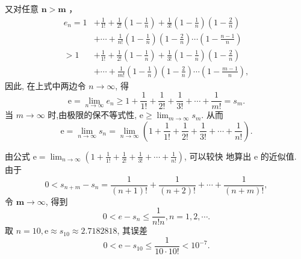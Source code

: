 \documentclass[t,12pt,mathserif] {beamer}
\begin{document}
\begin{frame}{}%
    又对任意 $\boldsymbol{n}>\boldsymbol{m}$ ，
$$
\begin{aligned}
e_n=1 & +\frac{1}{1 !}+\frac{1}{2 !}\left(1-\frac{1}{n}\right)+\frac{1}{3 !}\left(1-\frac{1}{n}\right)\left(1-\frac{2}{n}\right) \\
& +\cdots+\frac{1}{n !}\left(1-\frac{1}{n}\right)\left(1-\frac{2}{n}\right) \cdots\left(1-\frac{n-1}{n}\right) \\
>1 & +\frac{1}{1 !}+\frac{1}{2 !}\left(1-\frac{1}{n}\right)+\frac{1}{3 !}\left(1-\frac{1}{n}\right)\left(1-\frac{2}{n}\right) \\
& +\cdots+\frac{1}{m !}\left(1-\frac{1}{n}\right)\left(1-\frac{2}{n}\right) \cdots\left(1-\frac{m-1}{n}\right),
\end{aligned}
$$
因此, 在上式中两边令 $n \rightarrow \infty$, 得
$$
\mathrm{e}=\lim _{n \rightarrow \infty} e_n \geq 1+\frac{1}{1 !}+\frac{1}{2 !}+\frac{1}{3 !}+\cdots+\frac{1}{m !}=s_m .
$$
当 $m \rightarrow \infty$ 时,由极限的保不等式性, $\mathrm{e} \geq \lim _{m \rightarrow \infty} s_m$.
从而
$$
\mathrm{e}=\lim _{n \rightarrow \infty} s_n=\lim _{n \rightarrow \infty}\left(1+\frac{1}{1 !}+\frac{1}{2 !}+\frac{1}{3 !}+\cdots+\frac{1}{n !}\right) .
$$

\end{frame}

\begin{frame}{}%
  由公式 $\mathrm{e}=\lim _{n \rightarrow \infty}\left(1+\frac{1}{1 !}+\frac{1}{2 !}+\frac{1}{3 !}+\cdots+\frac{1}{n !}\right)$, 可以较快 地算出 $\mathrm{e}$ 的近似值.  \\
  由于
$$
0<s_{n+m}-s_n=\frac{1}{(n+1) !}+\frac{1}{(n+2) !}+\cdots+\frac{1}{(n+m) !},
$$
令 $\boldsymbol{m} \rightarrow \infty$, 得到
$$
0<e-s_n \leq \frac{1}{n ! n}, n=1,2, \cdots .
$$
取 $n=10, \mathrm{e} \approx s_{10} \approx 2.7182818$, 其误差
$$
0<\mathrm{e}-s_{10} \leq \frac{1}{10 \cdot 10 !}<10^{-7}.
$$
\end{frame}
\end{document}
